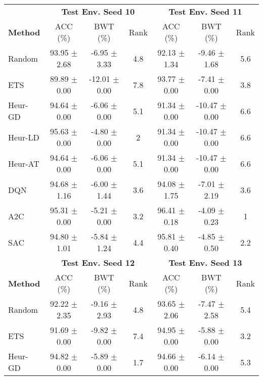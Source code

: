 
\begin{tabular}{lcccccc}
	\toprule 
	& \multicolumn{3}{c}{\textbf{Test Env. Seed 10}} & \multicolumn{3}{c}{\textbf{Test Env. Seed 11}} \\
	\cmidrule(lr){2-4} \cmidrule(lr){5-7}
	\textbf{Method} & ACC (\%)          & BWT (\%)          & Rank   & ACC (\%)          & BWT (\%)          & Rank   \\
	\midrule 
	Random          & 93.95 $\pm$ 2.68    & -6.95 $\pm$ 3.33    & 4.8    & 92.13 $\pm$ 1.34    & -9.46 $\pm$ 1.68    & 5.6    \\
	ETS             & 89.89 $\pm$ 0.00    & -12.01 $\pm$ 0.00   & 7.8    & 93.77 $\pm$ 0.00    & -7.41 $\pm$ 0.00    & 3.8    \\
	Heur-GD         & 94.64 $\pm$ 0.00    & -6.06 $\pm$ 0.00    & 5.1    & 91.34 $\pm$ 0.00    & -10.47 $\pm$ 0.00   & 6.6    \\
	Heur-LD         & 95.63 $\pm$ 0.00    & -4.80 $\pm$ 0.00    & 2      & 91.34 $\pm$ 0.00    & -10.47 $\pm$ 0.00   & 6.6    \\
	Heur-AT         & 94.64 $\pm$ 0.00    & -6.06 $\pm$ 0.00    & 5.1    & 91.34 $\pm$ 0.00    & -10.47 $\pm$ 0.00   & 6.6    \\
	DQN             & 94.68 $\pm$ 1.16    & -6.00 $\pm$ 1.44    & 3.6    & 94.08 $\pm$ 1.75    & -7.01 $\pm$ 2.19    & 3.6    \\
	A2C             & 95.31 $\pm$ 0.00    & -5.21 $\pm$ 0.00    & 3.2    & 96.41 $\pm$ 0.18    & -4.09 $\pm$ 0.23    & 1      \\
	SAC             & 94.80 $\pm$ 1.01    & -5.84 $\pm$ 1.24    & 4.4    & 95.81 $\pm$ 0.40    & -4.85 $\pm$ 0.50    & 2.2    \\
	\midrule 
	& \multicolumn{3}{c}{\textbf{Test Env. Seed 12}} & \multicolumn{3}{c}{\textbf{Test Env. Seed 13}} \\ 
	\cmidrule(lr){2-4} \cmidrule(lr){5-7}
	\textbf{Method} & ACC (\%)          & BWT (\%)          & Rank   & ACC (\%)          & BWT (\%)          & Rank   \\ 
	\midrule 
	Random          & 92.22 $\pm$ 2.35    & -9.16 $\pm$ 2.93    & 4.8    & 93.65 $\pm$ 2.06    & -7.47 $\pm$ 2.58    & 5.4    \\
	ETS             & 91.69 $\pm$ 0.00    & -9.82 $\pm$ 0.00    & 7.4    & 94.95 $\pm$ 0.00    & -5.88 $\pm$ 0.00    & 3.2    \\
	Heur-GD         & 94.82 $\pm$ 0.00    & -5.89 $\pm$ 0.00    & 1.7    & 94.66 $\pm$ 0.00    & -6.14 $\pm$ 0.00    & 5.3    \\

\end{tabular}
